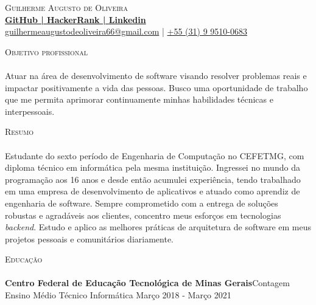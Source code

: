 \documentclass[a4paper]{article}
\newcommand{\lineunder} {
    \vspace*{-8pt} \\
    \hspace*{-18pt} \hrulefill \\
}
\newcommand{\header} [1] {
    {\hspace*{-18pt}\vspace*{6pt} \textsc{#1}}
    \vspace*{-6pt} \lineunder
}
\begin{document}
\vspace*{-40pt}

%
%
\vspace*{-2pt}
\begin{center}
    {\Huge \scshape {Guilherme Augusto de Oliveira}}\\
    \textbf{\href{https://github.com/Guilhermeaug}{GitHub | }}\textbf{\href{https://www.hackerrank.com/Guilhermeaug}{HackerRank | }}\textbf{\href{https://www.linkedin.com/in/guihermeaugusto/}{Linkedin}}\\
    \vspace*{2pt}
    \href{mailto:guilhermeaugustodeoliveira66@gmail.com}{guilhermeaugustodeoliveira66@gmail.com} | \href{tel:+55 (31) 9 9510-0683}{+55 (31) 9 9510-0683}\\
    \vspace*{2pt}
\end{center}

%
\header{Objetivo profissional}
\vspace{2mm}
Atuar na área de desenvolvimento de software visando resolver problemas reais e impactar positivamente a vida das pessoas. Busco uma oportunidade de trabalho que me permita aprimorar continuamente minhas habilidades técnicas e interpessoais.
\vspace{2mm}


%
\header{Resumo}
\vspace{2mm}
Estudante do sexto período de Engenharia de Computação no CEFETMG, com diploma técnico em informática pela mesma instituição. Ingressei no mundo da programação aos 16 anos e desde então acumulei experiência, tendo trabalhado em uma empresa de desenvolvimento de aplicativos e atuado como aprendiz de engenharia de software. Sempre comprometido com a entrega de soluções robustas e agradáveis aos clientes, concentro meus esforços em tecnologias \textit{backend}. Estudo e aplico as melhores práticas de arquitetura de software em meus projetos pessoais e comunitários diariamente.
\vspace{2mm}

%
%
\header{Educação}
\vspace{2mm}
\textbf{Centro Federal de Educação Tecnológica de Minas Gerais}\hfill Contagem\\
Ensino Médio Técnico Informática \hfill Março 2018 - Março 2021\\
\end{document}
